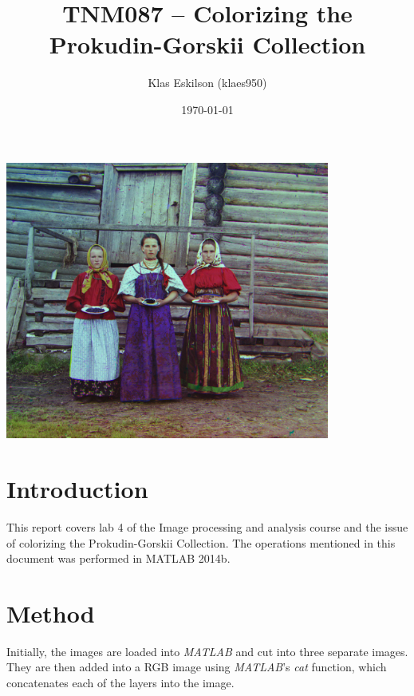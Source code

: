 \documentclass[12pt,a4paper]{article}
\newenvironment{Figure}
  {\par\medskip\noindent\minipage{\linewidth}}
  {\endminipage\par\medskip}
\begin{document}
\title{TNM087 – Colorizing the Prokudin-Gorskii Collection}
\author{Klas Eskilson (klaes950)}
\date{\today}

\maketitle %


\begin{Figure}
  \centering
    \includegraphics[width=0.8\textwidth]{result.jpg}
    \label{fig:final_result}
\end{Figure}

\section*{Introduction}

  This report covers lab 4 of the Image processing and analysis course and the issue of colorizing the Prokudin-Gorskii Collection. The operations mentioned in this document was performed in MATLAB 2014b.

\section*{Method}

  Initially, the images are loaded into \emph{MATLAB} and cut into three separate images. They are then added into a RGB image using \emph{MATLAB}'s \emph{cat} function, which concatenates each of the layers into the image.
\end{document}
